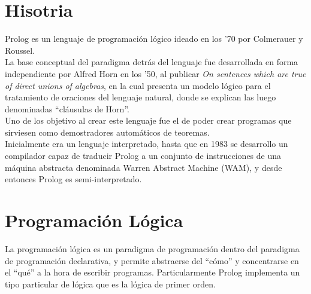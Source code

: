 \documentclass[12pt,titlepage]{report}
\begin{document}

\setcounter{page}{1}

\tableofcontents
\newpage



\clearpage	

\section{Hisotria}
Prolog es un lenguaje de programación lógico ideado en los '70 por Colmerauer y Roussel. \\

La base conceptual del paradigma detrás del lenguaje fue desarrollada en forma independiente por Alfred Horn en los '50, al publicar \textit{On sentences which are true of direct unions of algebras}, en la cual presenta un modelo lógico para el tratamiento de oraciones del lenguaje natural, donde se explican las luego denominadas ``cláusulas de Horn''. \\

Uno de los objetivo al crear este lenguaje fue el de poder crear programas que sirviesen como demostradores automáticos de teoremas. \\

Inicialmente era un lenguaje interpretado, hasta que en 1983 se desarrollo un compilador capaz de traducir Prolog a un conjunto de instrucciones de una máquina abstracta denominada Warren Abstract Machine (WAM), y desde entonces Prolog es semi-interpretado. \\

\section{Programación Lógica}
La programación lógica es un paradigma de programación dentro del paradigma de programación declarativa, y permite abstraerse del ``cómo'' y concentrarse en el ``qué'' a la hora de escribir programas. Particularmente Prolog implementa un tipo particular de lógica que es la lógica de primer orden. \\
\end{document}
